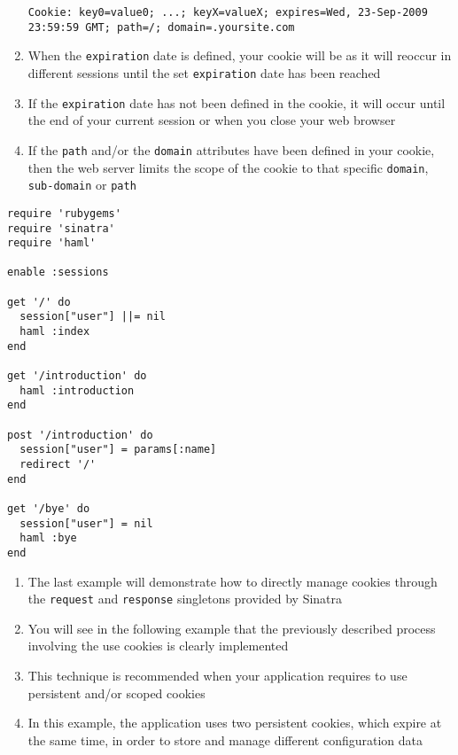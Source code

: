 \begin{enumerate}
\begin{verbatim}
Cookie: key0=value0; ...; keyX=valueX; expires=Wed, 23-Sep-2009 23:59:59 GMT; path=/; domain=.yoursite.com
\end{verbatim}

\item 
When the \verb|expiration| date is defined, your cookie will be  as it will reoccur in different sessions until the set \verb|expiration| date has been reached
\item  If the \verb|expiration| date has not been defined in the cookie, it will occur until the end of your current session or when you close your web browser
\item  If the \verb|path| and/or the \verb|domain| attributes have been defined in your cookie, then the web server limits the scope of the cookie to that specific \verb|domain|, \verb|sub-domain| or \verb|path|
\end{enumerate}

\begin{verbatim}
require 'rubygems'
require 'sinatra'
require 'haml'

enable :sessions

get '/' do
  session["user"] ||= nil
  haml :index
end

get '/introduction' do
  haml :introduction
end

post '/introduction' do
  session["user"] = params[:name]
  redirect '/'
end

get '/bye' do
  session["user"] = nil
  haml :bye
end
\end{verbatim}

\begin{enumerate}
\item 
The last example will demonstrate how to directly manage cookies through the 
\verb|request| and \verb|response| singletons provided by Sinatra
\item  You will see in the following example that the previously described process involving the use cookies is clearly implemented
\item  This technique is recommended when your application requires to use persistent and/or scoped cookies
\item  In this example, the application uses two persistent cookies, which expire at the same time, in order to store and manage different configuration data
\end{enumerate}

